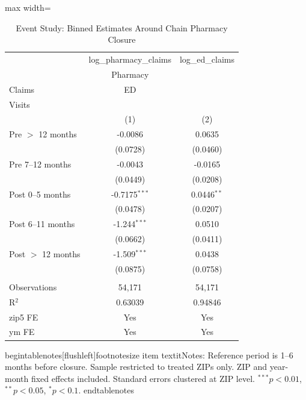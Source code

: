 \begin{table}[htbp]
   \caption{\label{tab:eventstudy} Event Study: Binned Estimates Around Chain Pharmacy Closure}
   \bigskip
   \centering
   \begin{adjustbox}{max width=\textwidth}
\begin{tabular}{lcc}
      \toprule
                         & log\_pharmacy\_claims   & log\_ed\_claims\\    
                         & Pharmacy\\Claims        & ED\\Visits \\     
                         & (1)                     & (2)\\  
      \midrule 
      Pre $>$ 12 months  & -0.0086                 & 0.0635\\   
                         & (0.0728)                & (0.0460)\\   
      Pre 7--12 months   & -0.0043                 & -0.0165\\   
                         & (0.0449)                & (0.0208)\\   
      Post 0--5 months   & -0.7175$^{***}$         & 0.0446$^{**}$\\   
                         & (0.0478)                & (0.0207)\\   
      Post 6--11 months  & -1.244$^{***}$          & 0.0510\\   
                         & (0.0662)                & (0.0411)\\   
      Post $>$ 12 months & -1.509$^{***}$          & 0.0438\\   
                         & (0.0875)                & (0.0758)\\   
       \\
      Observations       & 54,171                  & 54,171\\  
      R$^2$              & 0.63039                 & 0.94846\\  
      \midrule 
      zip5 FE            & Yes                     & Yes\\  
      ym FE              & Yes                     & Yes\\  
      \bottomrule
   \end{tabular}
\end{adjustbox}
begin{tablenotes}[flushleft]footnotesize
item textit{Notes:} Reference period is 1--6 months before closure. Sample restricted to treated ZIPs only. ZIP and year-month fixed effects included. Standard errors clustered at ZIP level. $^{***}p<0.01$, $^{**}p<0.05$, $^{*}p<0.1$.
end{tablenotes}
\end{table}
